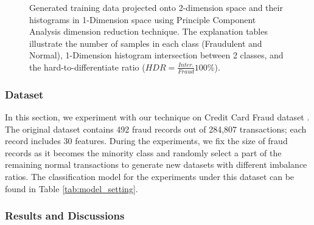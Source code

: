 \begin{figure}[h!]
	\caption{Generated training data projected onto 2-dimension space and their histograms in 1-Dimension space using Principle Component Analysis dimension reduction technique. The explanation tables illustrate the number of samples in each class (Fraudulent and Normal), 1-Dimension histogram intersection between 2 classes, and the hard-to-differentiate ratio ($HDR = \frac{Inter.}{Fraud}100\%$).}
	\label{fig:creditcard_plot}
	
\end{figure}



\subsubsection{Dataset}
In this section, we experiment with our technique on Credit Card Fraud dataset \cite{goy_credit_2019}. The original dataset contains 492 fraud records out of 284,807 transactions; each record includes 30 features. During the experiments, we fix the size of fraud records as it becomes the minority class and randomly select a part of the remaining normal transactions to generate new datasets with different imbalance ratios. The classification model for the experiments under this dataset can be found in Table \ref{tab:model_setting}.

\subsubsection{Results and Discussions} 


